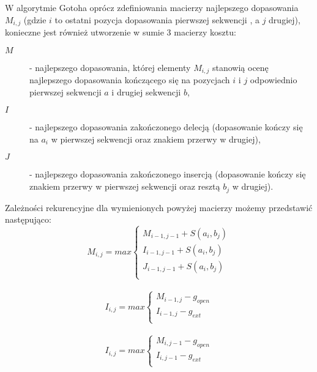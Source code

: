 \documentclass[a4paper,10pt]{article}
\begin{document}
	W algorytmie Gotoha oprócz zdefiniowania macierzy najlepszego dopasowania $M_{i,j}$ (gdzie $i$ to ostatni pozycja dopasowania pierwszej sekwencji , a $j$ drugiej), konieczne jest również utworzenie w sumie 3 macierzy kosztu:
	\begin{description}
	\item[$M$]
	 - najlepszego dopasowania, której elementy $M_{i,j}$ stanowią ocenę najlepszego dopasowania kończącego się na pozycjach $i$ i $j$ odpowiednio pierwszej sekwencji $a$ i drugiej sekwencji $b$,
	\item[$I$]
	 - najlepszego dopasowania zakończonego delecją (dopasowanie kończy się na $a_i$ w pierwszej sekwencji oraz znakiem przerwy w drugiej),
	\item[$J$]
	 - najlepszego dopasowania zakończonego insercją (dopasowanie kończy się znakiem przerwy w pierwszej sekwencji oraz resztą $b_j$ w drugiej).
	\end{description}
	Zależności rekurencyjne dla wymienionych powyżej macierzy możemy przedstawić następująco:
	\[
		M_{i,j} = max \left\{
			\begin{array}{ll}
				M_{i-1, j-1} + S(a_i, b_j)\\
				I_{i-1, j-1} + S(a_i, b_j)\\
				J_{i-1, j-1} + S(a_i, b_j)\\
			\end{array} \right.
	\]\\
	\[
		I_{i,j} = max \left\{
			\begin{array}{ll}
				M_{i-1, j} - g_{open}\\
				I_{i-1, j} - g_{ext}\\
			\end{array} \right.
	\]\\
	\[
		I_{i,j} = max \left\{
			\begin{array}{ll}
				M_{i, j-1} - g_{open}\\
				I_{i, j-1} - g_{ext}\\
			\end{array} \right.
	\]
\end{document}
